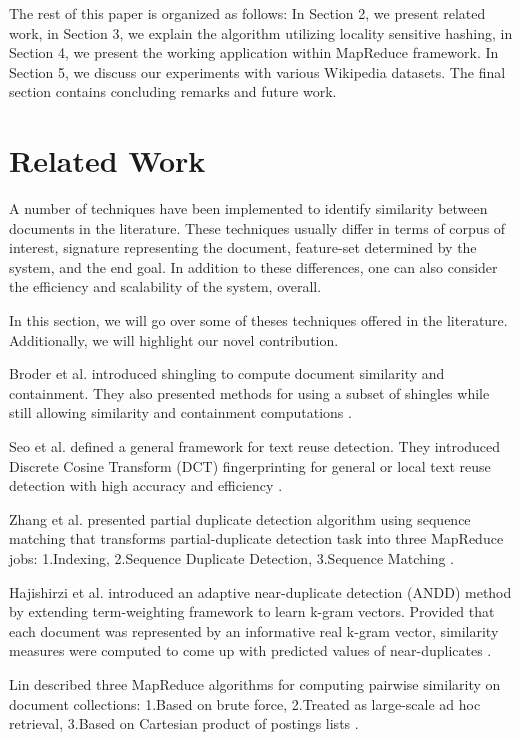 \documentclass{acm_proc_article-sp}
\begin{document}
The rest of this paper is organized as follows: In Section 2, we present related work, in Section 3, we explain the algorithm utilizing locality sensitive hashing, in Section 4, we present the working application within MapReduce framework. In Section 5, we discuss our experiments with various Wikipedia datasets. The final section contains concluding remarks and future work.

\section{Related Work}
A number of techniques have been implemented to identify similarity between documents in the literature. These techniques usually differ in terms of corpus of interest, signature representing the document, feature-set determined by the system, and the end goal. In addition to these differences, one can also consider the efficiency and scalability of the system, overall. 

In this section, we will go over some of theses techniques offered in the literature. Additionally, we will highlight our novel contribution.

Broder et al. introduced shingling to compute document similarity and containment. They also presented methods for using a subset of shingles while still allowing similarity and containment computations \cite{broder:resemblance}.

Seo et al. defined a general framework for text reuse detection. They introduced Discrete Cosine Transform (DCT) fingerprinting for general or local text reuse detection with high accuracy and efficiency \cite{seo:dct}.

Zhang et al. presented partial duplicate detection algorithm using sequence matching that transforms partial-duplicate detection task into three MapReduce jobs: 1.Indexing, 2.Sequence Duplicate Detection, 3.Sequence Matching \cite{zhang:pdc}.

Hajishirzi et al. introduced an adaptive near-duplicate detection (ANDD) method by extending term-weighting framework to learn k-gram vectors. Provided that each document was represented by an informative real k-gram vector, similarity measures were computed to come up with predicted values of near-duplicates \cite{hajishirzi:andd}.

Lin described three MapReduce algorithms for computing pairwise similarity on document collections: 1.Based on brute force, 2.Treated as large-scale ad hoc retrieval, 3.Based on Cartesian product of postings lists \cite{lin:brute}.
\end{document}
